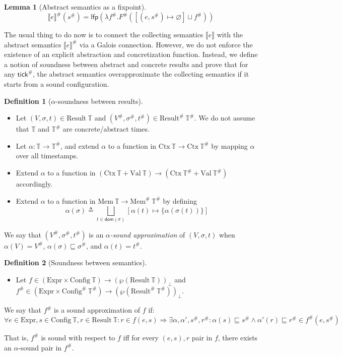 \documentclass{article}
\theoremstyle{definition}
\newtheorem{definition}{Definition}[section]
\newtheorem{lem}{Lemma}[section]
\newcommand*{\A}[1]{{#1}^{\#}}
\newcommand*{\Expr}{\text{Expr}}
\newcommand*{\Time}{\mathbb{T}}
\newcommand*{\ATime}{\A{\Time}}
\newcommand*{\Ctx}[1]{\text{Ctx}\:{#1}}
\newcommand*{\Value}[1]{\text{Val}\:{#1}}
\newcommand*{\Mem}[1]{\text{Mem}\:{#1}}
\newcommand*{\AMem}[1]{\A{\text{Mem}}\:{#1}}
\newcommand*{\Config}[1]{\text{Config}\:{#1}}
\newcommand*{\AConfig}[1]{\A{\text{Config}}\:{#1}}
\newcommand*{\Result}[1]{\text{Result}\:{#1}}
\newcommand*{\AResult}[1]{\A{\text{Result}}\:{#1}}
\newcommand*{\sembracket}[1]{\lBrack{#1}\rBrack}
\newcommand*{\tick}{\mathsf{tick}}
\begin{document}
\begin{lem}[Abstract semantics as a fixpoint]
\[
  \A{\sembracket{e}}(\A{s})=\mathsf{lfp}(\lambda \A{f}.\A{F}([(e,\A{s})\mapsto\varnothing]\sqcup\A{f}))
\]  
\end{lem}

The usual thing to do now is to connect the collecting semantics $\sembracket{e}$ with the abstract semantics $\A{\sembracket{e}}$ via a Galois connection.
However, we do not enforce the existence of an explicit abstraction and concretization function.
Instead, we define a notion of soundness between abstract and concrete results and prove that for any $\A{\tick}$, the abstract semantics overapproximate the collecting semantics if it starts from a sound configuration.

\begin{definition}[$\alpha$-soundness between results]
  $\:$

  \begin{itemize}
    \item Let $(V,\sigma,t)\in\Result{\Time}$ and $(\A{V},\A\sigma,\A{t})\in\AResult{\ATime}$. We do not assume that $\Time$ and $\ATime$ are concrete/abstract times.
    \item Let $\alpha:\Time\rightarrow\ATime$, and extend $\alpha$ to a function in $\Ctx{\Time}\rightarrow\Ctx{\ATime}$ by mapping $\alpha$ over all timestamps.
    \item Extend $\alpha$ to a function in $(\Ctx{\Time}+\Value{\Time})\rightarrow(\Ctx{\ATime}+\Value{\ATime})$ accordingly.
    \item Extend $\alpha$ to a function in $\Mem{\Time}\rightarrow\AMem{\ATime}$ by defining
        \[\alpha(\sigma)\triangleq\bigsqcup_{t\in\mathsf{dom}(\sigma)}[\alpha(t)\mapsto\{\alpha(\sigma(t))\}]\]
  \end{itemize}

  We say that $(\A{V},\A\sigma,\A{t})$ is an \emph{$\alpha$-sound approximation} of $(V,\sigma,t)$ when $\alpha(V)=\A{V}$, $\alpha(\sigma)\sqsubseteq\A\sigma$, and $\alpha(t)=\A{t}$.
\end{definition}

\begin{definition}[Soundness between semantics]
  $\:$

  \begin{itemize}
    \item Let $f\in(\Expr\times\Config{\Time})\rightarrow(\wp(\Result{\Time}))_{\bot}$ and $\A{f}\in(\Expr\times\AConfig{\ATime})\rightarrow(\wp(\AResult{\ATime}))_{\bot}$.
  \end{itemize}

  We say that $\A{f}$ is a sound approximation of $f$ if:
  \[
    \forall e\in\Expr,s\in\Config{\Time},r\in\Result{\Time}:r\in f(e,s)\Rightarrow\exists\alpha,\alpha',\A{s},\A{r}:\alpha(s)\sqsubseteq\A{s}\wedge\alpha'(r)\sqsubseteq\A{r}\in\A{f}(e,\A{s})
  \]

  That is, $\A{f}$ is sound with respect to $f$ iff for every $(e,s), r$ pair in $f$, there exists an $\alpha$-sound pair in $\A{f}$.
\end{definition}
\end{document}
